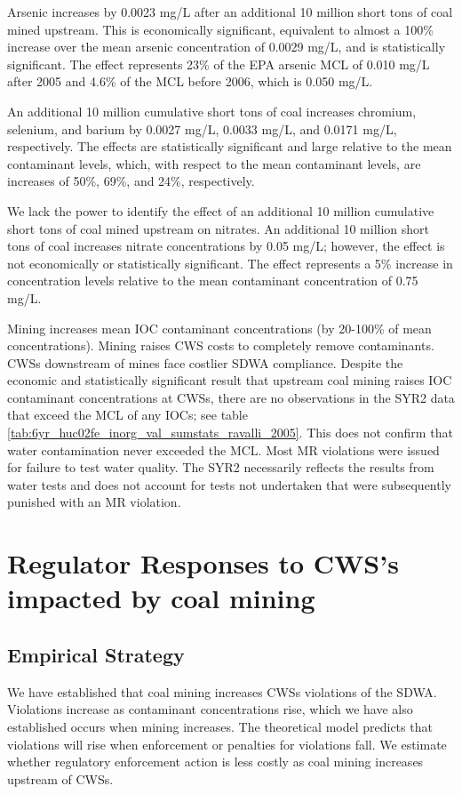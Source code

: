 \documentclass{article}
\begin{document}
Arsenic increases by 0.0023 mg/L after an additional 10 million short tons of coal mined upstream. This is economically significant, equivalent to almost a 100\% increase over the mean arsenic concentration of 0.0029 mg/L, and is statistically significant. The effect represents 23\% of the EPA arsenic MCL of 0.010 mg/L after 2005 and 4.6\% of the MCL before 2006, which is 0.050 mg/L.

An additional 10 million cumulative short tons of coal increases chromium, selenium, and barium by 0.0027 mg/L, 0.0033 mg/L, and 0.0171 mg/L, respectively. The effects are statistically significant and large relative to the mean contaminant levels, which, with respect to the mean contaminant levels, are increases of 50\%, 69\%, and 24\%, respectively.

We lack the power to identify the effect of an additional 10 million cumulative short tons of coal mined upstream on nitrates. An additional 10 million short tons of coal increases nitrate concentrations by 0.05 mg/L; however, the effect is not economically or statistically significant. The effect represents a 5\% increase in concentration levels relative to the mean contaminant concentration of 0.75 mg/L.

Mining increases mean IOC contaminant concentrations (by 20-100\%
of mean concentrations). Mining raises CWS costs to completely remove contaminants. CWSs downstream of mines face costlier SDWA compliance. Despite the economic and statistically significant result that upstream coal mining raises IOC contaminant concentrations at CWSs, there are no observations in the SYR2 data that exceed the MCL of any IOCs; see table \ref{tab:6yr_huc02fe_inorg_val_sumstats_ravalli_2005}. This does not confirm that water contamination never exceeded the MCL. Most MR violations were issued for failure to test water quality. The SYR2 necessarily reflects the results from water tests and does not account for tests not undertaken that were subsequently punished with an MR violation.

\section{Regulator Responses to CWS's impacted by coal mining}

\subsection{Empirical Strategy}

We have established that coal mining increases CWSs violations of the SDWA. Violations increase as contaminant concentrations rise, which we have also established occurs when mining increases. The theoretical model predicts that violations will rise when enforcement or penalties for violations fall. We estimate whether regulatory enforcement action is less costly as coal mining increases upstream of CWSs. 
\end{document}
